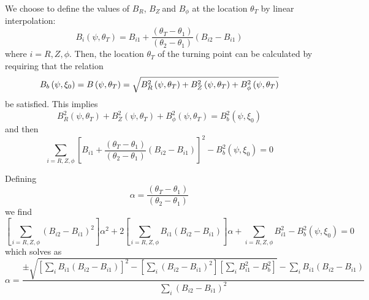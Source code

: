 We choose to define the values of $B_{R}$, $B_{Z}\ $and $B_{\phi }$ at the
location $\theta _{T}$ by linear interpolation:
\begin{equation}
B_{i}\left( \psi ,\theta _{T}\right) =B_{i1}+\frac{\left( \theta _{T}-\theta
_{1}\right) }{\left( \theta _{2}-\theta _{1}\right) }\left(
B_{i2}-B_{i1}\right)
\end{equation}
where $i=R,Z,\phi $. Then, the location $\theta _{T}$ of the turning point
can be calculated by requiring that the relation
\begin{equation}
B_{b}\left( \psi ,\xi _{0}\right) =B\left( \psi ,\theta _{T}\right) =\sqrt{%
B_{R}^{2}\left( \psi ,\theta _{T}\right) +B_{Z}^{2}\left( \psi ,\theta
_{T}\right) +B_{\phi }^{2}\left( \psi ,\theta _{T}\right) }
\end{equation}
be satisfied. This implies
\begin{equation}
B_{R}^{2}\left( \psi ,\theta _{T}\right) +B_{Z}^{2}\left( \psi ,\theta
_{T}\right) +B_{\phi }^{2}\left( \psi ,\theta _{T}\right) =B_{b}^{2}\left(
\psi ,\xi _{0}\right)
\end{equation}
and then
\begin{equation}
\sum_{i=R,Z,\phi }\left[ B_{i1}+\frac{\left( \theta _{T}-\theta _{1}\right)
}{\left( \theta _{2}-\theta _{1}\right) }\left( B_{i2}-B_{i1}\right) \right]
^{2}-B_{b}^{2}\left( \psi ,\xi _{0}\right) =0
\end{equation}

Defining
\begin{equation}
\alpha =\frac{\left( \theta _{T}-\theta _{1}\right) }{\left( \theta
_{2}-\theta _{1}\right) }
\end{equation}
we find
\begin{equation}
\left[ \sum_{i=R,Z,\phi }\left( B_{i2}-B_{i1}\right) ^{2}\right] \alpha
^{2}+2\left[ \sum_{i=R,Z,\phi }B_{i1}\left( B_{i2}-B_{i1}\right) \right]
\alpha +\sum_{i=R,Z,\phi }B_{i1}^{2}-B_{b}^{2}\left( \psi ,\xi _{0}\right) =0
\end{equation}
which solves as
\begin{equation}
\alpha =\frac{\pm \sqrt{\left[ \sum_{i}B_{i1}\left( B_{i2}-B_{i1}\right)
\right] ^{2}-\left[ \sum_{i}\left( B_{i2}-B_{i1}\right) ^{2}\right] \left[
\sum_{i}B_{i1}^{2}-B_{b}^{2}\right] }%
-\sum_{i}B_{i1}\left( B_{i2}-B_{i1}\right) }{\sum_{i}\left(
B_{i2}-B_{i1}\right) ^{2}}
\end{equation}

